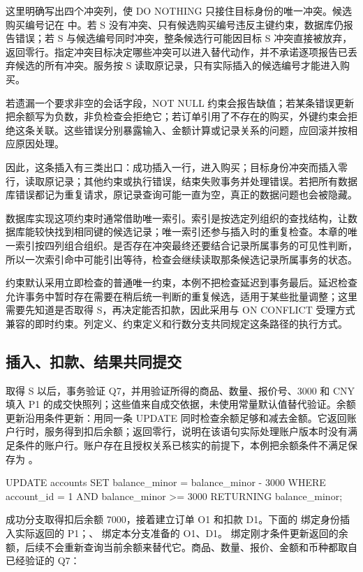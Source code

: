 这里明确写出四个冲突列，使 DO NOTHING 只接住目标身份的唯一冲突。候选购买编号记在  中。若 S 没有冲突、只有候选购买编号违反主键约束，数据库仍报告错误；若 S 与候选编号同时冲突，整条候选行可能因目标 S 冲突直接被放弃，返回零行。指定冲突目标决定哪些冲突可以进入替代动作，并不承诺逐项报告已丢弃候选的所有冲突。服务按 S 读取原记录，只有实际插入的候选编号才能进入购买。

若遗漏一个要求非空的会话字段，NOT NULL 约束会报告缺值；若某条错误更新把余额写为负数，非负检查会拒绝它；若订单引用了不存在的购买，外键约束会拒绝这条关联。这些错误分别暴露输入、金额计算或记录关系的问题，应回滚并按相应原因处理。

因此，这条插入有三类出口：成功插入一行，进入购买；目标身份冲突而插入零行，读取原记录；其他约束或执行错误，结束失败事务并处理错误。若把所有数据库错误都记为重复请求，原记录查询可能一直为空，真正的数据问题也会被隐藏。

数据库实现这项约束时通常借助唯一索引。索引是按选定列组织的查找结构，让数据库能较快找到相同键的候选记录；唯一索引还参与插入时的重复检查。本章的唯一索引按四列组合组织。是否存在冲突最终还要结合记录所属事务的可见性判断，所以一次索引命中可能引出等待，检查会继续读取那条候选记录所属事务的状态。

约束默认采用立即检查的普通唯一约束，本例不把检查延迟到事务最后。延迟检查允许事务中暂时存在需要在稍后统一判断的重复候选，适用于某些批量调整；这里需要先知道是否取得 S，再决定能否扣款，因此采用与 ON CONFLICT 受理方式兼容的即时约束。列定义、约束定义和行数分支共同规定这条路径的执行方式。

\subsection*{插入、扣款、结果共同提交}

取得 S 以后，事务验证 Q7，并用验证所得的商品、数量、报价号、3000 和 CNY 填入 P1 的成交快照列；这些值来自成交依据，未使用常量默认值替代验证。余额更新沿用条件更新：用同一条 UPDATE 同时检查余额足够和减去金额。它返回账户行时，服务得到扣后余额；返回零行，说明在该语句实际处理账户版本时没有满足条件的账户行。账户存在且授权关系已核实的前提下，本例把余额条件不满足保存为 。

\begin{BookCode}
UPDATE accounts
SET balance_minor = balance_minor - 3000
WHERE account_id = 1 AND balance_minor >= 3000
RETURNING balance_minor;
\end{BookCode}

成功分支取得扣后余额 7000，接着建立订单 O1 和扣款 D1。下面的  绑定身份插入实际返回的 P1；、 绑定本分支准备的 O1、D1。 绑定刚才条件更新返回的余额，后续不会重新查询当前余额来替代它。商品、数量、报价、金额和币种都取自已经验证的 Q7：

